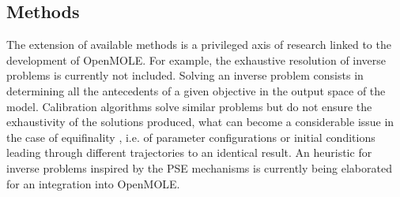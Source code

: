 \documentclass[10pt]{article}
\begin{document}
\subsection{Methods}

The extension of available methods is a privileged axis of research linked to the development of OpenMOLE. For example, the exhaustive resolution of inverse problems \citep{aster2018parameter} is currently not included. Solving an inverse problem consists in determining all the antecedents of a given objective in the output space of the model. Calibration algorithms solve similar problems but do not ensure the exhaustivity of the solutions produced, what can become a considerable issue in the case of equifinality \citep{}, i.e. of parameter configurations or initial conditions leading through different trajectories to an identical result. An heuristic for inverse problems inspired by the PSE mechanisms is currently being elaborated for an integration into OpenMOLE.
\end{document}
